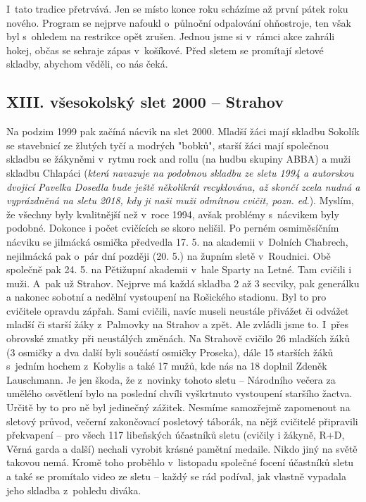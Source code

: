 \documentclass[a5paper, 12pt, twoside]{article}
\begin{document}
I~tato tradice přetrvává. Jen se místo konce roku scházíme až první
pátek roku nového. Program se nejprve nafoukl o~půlnoční odpalování
ohňostroje, ten však byl s~ohledem na restrikce opět zrušen. Jednou jsme
si v~rámci akce zahráli hokej, občas se sehraje zápas v~košíkové. Před
sletem se promítají sletové skladby, abychom věděli, co nás čeká.

\subsection{XIII. všesokolský slet 2000 --
Strahov}

Na podzim 1999 pak začíná nácvik na slet 2000. Mladší žáci mají skladbu
Sokolík se stavebnicí ze žlutých tyčí a modrých "bobků", starší žáci
mají společnou skladbu se žákyněmi v~rytmu rock and rollu (na hudbu
skupiny ABBA) a muži skladbu Chlapáci (\textit{která navazuje na podobnou
skladbu ze sletu 1994 a autorskou dvojicí Pavelka Dosedla bude ještě
několikrát recyklována, až skončí zcela nudná a vyprázdněná na sletu
2018, kdy ji naši muži odmítnou cvičit, pozn. ed}.). Myslím, že všechny
byly kvalitnější než v~roce 1994, avšak problémy s~nácvikem byly
podobné. Dokonce i počet cvičících se skoro nelišil. Po perném
osmiměsíčním nácviku se jilmácká osmička předvedla 17. 5. na akademii
v~Dolních Chabrech, nejilmácká pak o~pár dní později (20. 5.) na župním
sletě v~Roudnici. Obě společně pak 24. 5. na Pětižupní akademii v~hale
Sparty na Letné. Tam cvičili i muži. A~pak už Strahov. Nejprve má každá
skladba 2 až 3 secviky, pak generálku a nakonec sobotní a nedělní
vystoupení na Rošického stadionu. Byl to pro cvičitele opravdu zápřah.
Sami cvičili, navíc museli neustále přivážet či odvážet mladší či starší
žáky z~Palmovky na Strahov a zpět. Ale zvládli jsme to. I~přes obrovské
zmatky při neustálých změnách. Na Strahově cvičilo 26 mladších žáků (3
osmičky a dva další byli součástí osmičky Proseka), dále 15 starších
žáků s~jedním hochem z~Kobylis a také 17 mužů, kde nás na 18 doplnil
Zdeněk Lauschmann. Je jen škoda, že z~novinky tohoto sletu -- Národního
večera za umělého osvětlení bylo na poslední chvíli vyškrtnuto
vystoupení staršího žactva. Určitě by to pro ně byl jedinečný zážitek.
Nesmíme samozřejmě zapomenout na sletový průvod, večerní zakončovací
posletový táborák, na nějž cvičitelé připravili překvapení -- pro všech
117 libeňských účastníků sletu (cvičily i žákyně, R+D, Věrná garda a
další) nechali vyrobit krásné pamětní medaile. Nikdo jiný na světě
takovou nemá. Kromě toho proběhlo v~listopadu společné focení účastníků
sletu a také se promítalo video ze sletu -- každý se rád podíval, jak
vlastně vypadala jeho skladba z~pohledu diváka.
\end{document}
